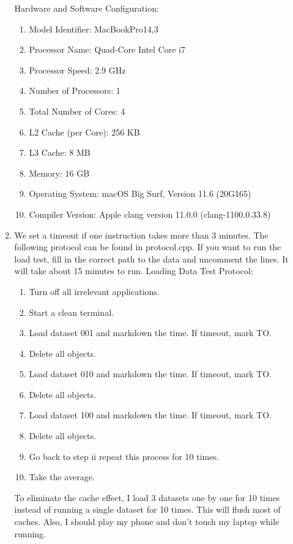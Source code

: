 \documentclass{article}
\begin{document}
\begin{enumerate}
\begin{enumerate}
Hardware and Software Configuration:

\begin{enumerate}
\item Model Identifier:	MacBookPro14,3

\item Processor Name:	Quad-Core Intel Core i7

\item Processor Speed:	2.9 GHz

\item Number of Processors:	1

\item Total Number of Cores:	4

\item L2 Cache (per Core):	256 KB

\item L3 Cache:	8 MB

\item Memory:	16 GB

\item Operating System: macOS Big Surf, Version 11.6 (20G165)

\item Compiler Version: Apple clang version 11.0.0 (clang-1100.0.33.8)

\end{enumerate}

\item 

We set a timeout if one instruction takes more than 3 minutes. The following protocol can be found in protocol.cpp. If you want to run the load test, fill in the correct path to the data and uncomment the lines. It will take about 15 minutes to run. 
\newpage
Loading Data Test Protocol:

\begin{enumerate}
\item Turn off all irrelevant applications.
\item Start a clean terminal.
\item Load dataset 001 and markdown the time. If timeout, mark TO. 
\item Delete all objects.
\item Load dataset 010 and markdown the time. If timeout, mark TO. 
\item Delete all objects.
\item Load dataset 100 and markdown the time. If timeout, mark TO. 
\item Delete all objects.
\item Go back to step ii repeat this process for 10 times.
\item Take the average. 
\end{enumerate}
To eliminate the cache effect, I load 3 datasets one by one for 10 times instead of running a single dataset for 10 times. This will flush most of caches. Also, I should play my phone and don't touch my laptop while running.


\end{enumerate}
\end{enumerate}
\end{document}
